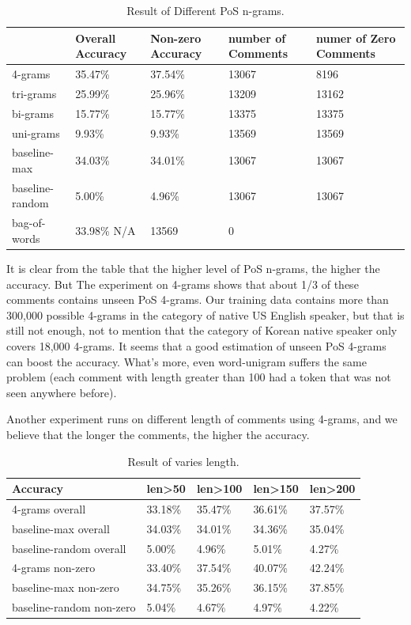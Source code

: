 \documentclass[11pt]{article}
\begin{document}
\begin{table}[h]
\begin{center}
\begin{tabular}{|l|l|l|l|l|}
\hline & \bf Overall Accuracy & \bf Non-zero Accuracy & \bf number of Comments & \bf numer of Zero Comments \\ \hline
4-grams & 35.47\% & 37.54\%  & 13067 & 8196 \\
tri-grams & 25.99\% & 25.96\% & 13209 & 13162 \\
bi-grams & 15.77\% & 15.77\%  & 13375 & 13375\\
uni-grams & 9.93\% & 9.93\%  & 13569 & 13569 \\
baseline-max & 34.03\% & 34.01\% & 13067 & 13067 \\
baseline-random & 5.00\% & 4.96\% & 13067 & 13067 \\
bag-of-words & 33.98\% N/A & 13569 & 0 \\
\hline
\end{tabular}
\end{center}
\caption{\label{font-table} Result of Different PoS n-grams. }
\end{table}

It is clear from the table that the higher level of PoS n-grams, the higher the accuracy. But The experiment on 4-grams shows that about 1/3 of these comments contains unseen PoS 4-grams. Our training data contains more than 300,000 possible 4-grams in the category of native US English speaker, but that is still not enough, not to mention that the category of Korean native speaker only covers 18,000 4-grams. It seems that a good estimation of unseen PoS 4-grams can boost the accuracy. What's more, even word-unigram suffers the same problem (each comment with length greater than 100 had a token that was not seen anywhere before).

Another experiment runs on different length of comments using 4-grams, and we believe that the longer the comments, the higher the accuracy.

\begin{table}[h]
\begin{center}
\begin{tabular}{|l|l|l|l|l|}
\hline Accuracy & \bf len>50 & \bf len>100 & \bf len>150 & \bf len>200 \\ \hline
4-grams overall & 33.18\% & 35.47\%  & 36.61\% & 37.57\% \\
baseline-max overall & 34.03\% & 34.01\% & 34.36\% & 35.04\% \\
baseline-random overall & 5.00\% & 4.96\%  & 5.01\% & 4.27\%\\
4-grams non-zero & 33.40\% & 37.54\%  & 40.07\% & 42.24\% \\
baseline-max non-zero & 34.75\% & 35.26\% & 36.15\% & 37.85\% \\
baseline-random non-zero & 5.04\% & 4.67\% & 4.97\% & 4.22\% \\
\hline
\end{tabular}
\end{center}
\caption{\label{font-table} Result of varies length. }
\end{table}
\end{document}
